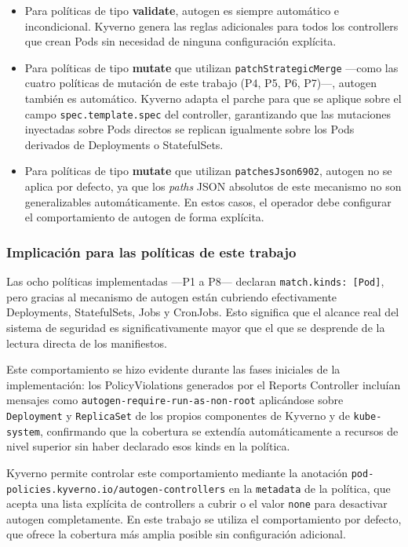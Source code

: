 \begin{itemize}
  \item Para políticas de tipo \textbf{validate}, autogen es siempre automático e incondicional. Kyverno genera las reglas adicionales para todos los controllers que crean Pods sin necesidad de ninguna configuración explícita.
  \item Para políticas de tipo \textbf{mutate} que utilizan \texttt{patchStrategicMerge} —como las cuatro políticas de mutación de este trabajo (P4, P5, P6, P7)—, autogen también es automático. Kyverno adapta el parche para que se aplique sobre el campo \texttt{spec.template.spec} del controller, garantizando que las mutaciones inyectadas sobre Pods directos se replican igualmente sobre los Pods derivados de Deployments o StatefulSets.
  \item Para políticas de tipo \textbf{mutate} que utilizan \texttt{patchesJson6902}, autogen no se aplica por defecto, ya que los \textit{paths} JSON absolutos de este mecanismo no son generalizables automáticamente. En estos casos, el operador debe configurar el comportamiento de autogen de forma explícita.
\end{itemize}

\subsubsection*{Implicación para las políticas de este trabajo}

Las ocho políticas implementadas —P1 a P8— declaran \texttt{match.kinds:\,[Pod]}, pero gracias al mecanismo de autogen están cubriendo efectivamente Deployments, StatefulSets, Jobs y CronJobs. Esto significa que el alcance real del sistema de seguridad es significativamente mayor que el que se desprende de la lectura directa de los manifiestos.

Este comportamiento se hizo evidente durante las fases iniciales de la implementación: los PolicyViolations generados por el Reports Controller incluían mensajes como \texttt{autogen-\allowbreak{}require-\allowbreak{}run-as-non-root} aplicándose sobre \texttt{Deployment} y \texttt{ReplicaSet} de los propios componentes de Kyverno y de \texttt{kube-system}, confirmando que la cobertura se extendía automáticamente a recursos de nivel superior sin haber declarado esos kinds en la política.

Kyverno permite controlar este comportamiento mediante la anotación \texttt{pod-policies.\allowbreak{}kyverno.io/\allowbreak{}autogen-controllers} en la \texttt{metadata} de la política, que acepta una lista explícita de controllers a cubrir o el valor \texttt{none} para desactivar autogen completamente. En este trabajo se utiliza el comportamiento por defecto, que ofrece la cobertura más amplia posible sin configuración adicional.

